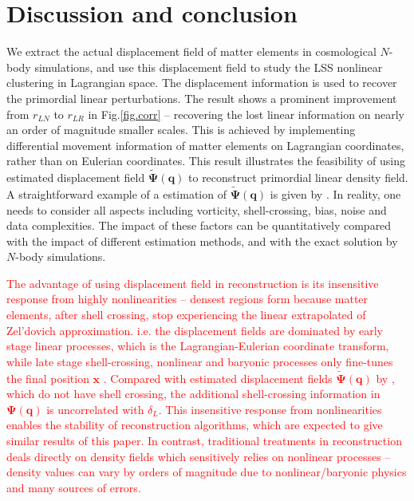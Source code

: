 \documentclass[aps,prd,twocolumn,superscriptaddress,amsfont,amssymb,amsmath,nofootinbib,showpacs,balancelastpage]{revtex4-1}
\newcommand{\bs}{\boldsymbol}
\newcommand{\tcr}{\textcolor{red}}
\begin{document}
\section{Discussion and conclusion}\label{sec.discussion}
We extract the actual displacement field of matter elements in cosmological $N$-body
simulations, and use this displacement field to study the LSS nonlinear
clustering in Lagrangian space. The displacement information is used to recover
the primordial linear perturbations. The result shows a prominent improvement from
$r_{LN}$ to $r_{LR}$ in Fig.\ref{fig.corr} -- recovering the lost linear information on
nearly an order of magnitude smaller scales.
This is achieved by implementing differential movement information
of matter elements on Lagrangian coordinates, rather than on
Eulerian coordinates. This result illustrates the feasibility
of using estimated displacement field $\tilde{\bs \Psi}(\bs q)$ to reconstruct primordial linear
density field. A straightforward example of a estimation of $\tilde{\bs \Psi}(\bs q)$
is given by \cite{1995ApJS..100..269P,1998ApJS..115...19P}.
In reality, one needs
to consider all aspects including vorticity, shell-crossing, bias, noise
and data complexities. The impact of these factors can be quantitatively
compared with the impact of different estimation methods, and with
the exact solution by $N$-body simulations.

\tcr{The advantage of using displacement field in reconstruction is
its insensitive response from highly nonlinearities --
densest regions form because matter elements, after shell crossing,
stop experiencing the linear extrapolated of Zel'dovich approximation.
i.e. the displacement fields are dominated by early stage linear processes,
which is the Lagrangian-Eulerian coordinate transform,
while late stage shell-crossing, nonlinear and baryonic processes
only fine-tunes the final position $\bs x$
\citep{2014PhRvD..89h3515C}. Compared with estimated displacement fields $\tilde{\bs \Psi}(\bs q)$
by \cite{1995ApJS..100..269P}, which do not have shell crossing,
the additional shell-crossing information in $\bs\Psi(\bs q)$
is uncorrelated with $\delta_L$. This insensitive response from
nonlinearities enables the stability of reconstruction algorithms,
which are expected to give similar results of this paper. 
In contrast, traditional
treatments in reconstruction deals directly on density fields which sensitively
relies on nonlinear processes --  density values can vary by orders
of magnitude due to nonlinear/baryonic physics and many sources of errors.}
\end{document}
